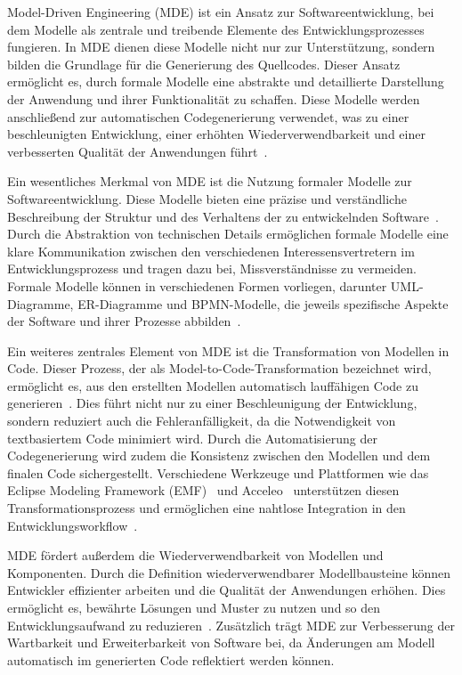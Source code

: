 Model-Driven Engineering (MDE) ist ein Ansatz zur Softwareentwicklung, bei dem Modelle als zentrale und treibende 
Elemente des Entwicklungsprozesses fungieren. In MDE dienen diese Modelle nicht nur zur Unterstützung, sondern 
bilden die Grundlage für die Generierung des Quellcodes. Dieser Ansatz ermöglicht es, durch formale Modelle 
eine abstrakte und detaillierte Darstellung der Anwendung und ihrer Funktionalität zu schaffen. Diese Modelle 
werden anschließend zur automatischen Codegenerierung verwendet, was zu einer beschleunigten Entwicklung, einer 
erhöhten Wiederverwendbarkeit und einer verbesserten Qualität der Anwendungen führt~\cite{Selic_2003}.

Ein wesentliches Merkmal von MDE ist die Nutzung formaler Modelle zur Softwareentwicklung. Diese Modelle bieten 
eine präzise und verständliche Beschreibung der Struktur und des Verhaltens der zu entwickelnden 
Software~\cite{Schmidt_2006}. Durch die Abstraktion von technischen Details ermöglichen formale Modelle 
eine klare Kommunikation zwischen den verschiedenen Interessensvertretern im Entwicklungsprozess und tragen dazu bei, 
Missverständnisse zu vermeiden. Formale Modelle können in verschiedenen Formen vorliegen, darunter UML-Diagramme, 
ER-Diagramme und BPMN-Modelle, die jeweils spezifische Aspekte der Software und ihrer Prozesse abbilden~\cite{Selic_2003}.

Ein weiteres zentrales Element von MDE ist die Transformation von Modellen in Code. Dieser Prozess, der als 
Model-to-Code-Transformation bezeichnet wird, ermöglicht es, aus den erstellten Modellen automatisch lauffähigen 
Code zu generieren~\cite{brambilla2017model}. Dies führt nicht nur zu einer Beschleunigung der Entwicklung, sondern 
reduziert auch die Fehleranfälligkeit, da die Notwendigkeit von textbasiertem Code minimiert wird. Durch die Automatisierung der 
Codegenerierung wird zudem die Konsistenz zwischen den Modellen und dem finalen Code sichergestellt. Verschiedene 
Werkzeuge und Plattformen wie das Eclipse Modeling Framework (EMF)~\cite{eclipseEclipse} und 
Acceleo~\cite{eclipseEclipseAcceleo} unterstützen diesen Transformationsprozess 
und ermöglichen eine nahtlose Integration in den Entwicklungsworkflow~\cite{steinberg2008emf}.

MDE fördert außerdem die Wiederverwendbarkeit von Modellen und Komponenten. Durch die Definition wiederverwendbarer 
Modellbausteine können Entwickler effizienter arbeiten und die Qualität der Anwendungen erhöhen. Dies ermöglicht es, 
bewährte Lösungen und Muster zu nutzen und so den Entwicklungsaufwand zu reduzieren~\cite{France_2007}. Zusätzlich 
trägt MDE zur Verbesserung der Wartbarkeit und Erweiterbarkeit von Software bei, da Änderungen am Modell automatisch 
im generierten Code reflektiert werden können.


